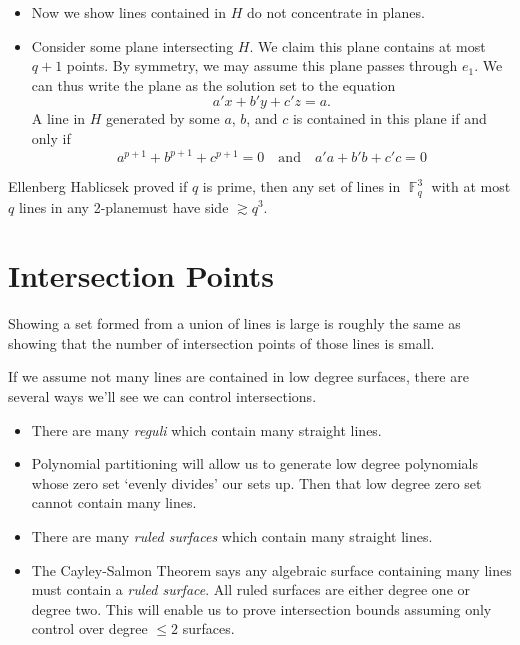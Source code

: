 \documentclass{article}
\DeclareMathOperator{\FF}{\mathbb{F}}
\theoremstyle{plain}
\theoremstyle{definition}
\begin{document}
\begin{itemize}
    \item Now we show lines contained in $H$ do not concentrate in planes.

    \item Consider some plane intersecting $H$. We claim this plane contains at most $q + 1$ points. By symmetry, we may assume this plane passes through $e_1$. We can thus write the plane as the solution set to the equation
    \[ a' x + b' y + c' z = a. \]
    A line in $H$ generated by some $a$, $b$, and $c$ is contained in this plane if and only if
    \[ a^{p+1} + b^{p+1} + c^{p+1} = 0 \quad\text{and}\quad a' a + b' b + c' c = 0 \]
\end{itemize}

Ellenberg Hablicsek proved if $q$ is prime, then any set of lines in $\FF_q^3$ with at most $q$ lines in any 2-planemust have side $\gtrsim q^3$.

\section{Intersection Points}

Showing a set formed from a union of lines is large is roughly the same as showing that the number of intersection points of those lines is small.

If we assume not many lines are contained in low degree surfaces, there are several ways we'll see we can control intersections.

\begin{itemize}
    \item There are many \emph{reguli} which contain many straight lines.

    \item Polynomial partitioning will allow us to generate low degree polynomials whose zero set `evenly divides' our sets up. Then that low degree zero set cannot contain many lines.

    \item There are many \emph{ruled surfaces} which contain many straight lines.

    \item The Cayley-Salmon Theorem says any algebraic surface containing many lines must contain a \emph{ruled surface}. All ruled surfaces are either degree one or degree two. This will enable us to prove intersection bounds assuming only control over degree $\leq 2$ surfaces.
\end{itemize}
\end{document}
